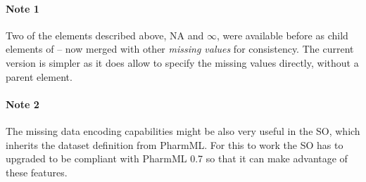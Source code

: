 \paragraph{Note 1} Two of the elements described above, NA and $\infty$, 
were available before as child elements of  -- now merged with 
other \emph{missing values} for consistency. The current version is simpler 
as it does allow to specify the missing values directly, without a parent element.  
\paragraph{Note 2} The missing data encoding capabilities might be also very useful 
in the SO, which inherits the dataset definition from PharmML. For this to work the SO 
has to upgraded to be compliant with PharmML 0.7 so that it can make advantage of these features. 

